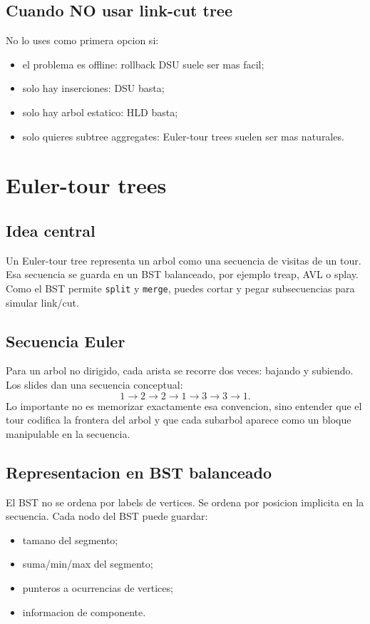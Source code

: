 \documentclass[10pt]{article}
\begin{document}
\subsection{Cuando NO usar link-cut tree}
No lo uses como primera opcion si:
\begin{itemize}[leftmargin=*]
\item el problema es offline: rollback DSU suele ser mas facil;
\item solo hay inserciones: DSU basta;
\item solo hay arbol estatico: HLD basta;
\item solo quieres subtree aggregates: Euler-tour trees suelen ser mas naturales.
\end{itemize}

\newpage
\section{Euler-tour trees}

\subsection{Idea central}
Un Euler-tour tree representa un arbol como una secuencia de visitas de un tour.
Esa secuencia se guarda en un BST balanceado, por ejemplo treap, AVL o splay.
Como el BST permite \texttt{split} y \texttt{merge}, puedes cortar y pegar
subsecuencias para simular link/cut.

\subsection{Secuencia Euler}
Para un arbol no dirigido, cada arista se recorre dos veces: bajando y subiendo.
Los slides dan una secuencia conceptual:
\[
1\to 2\to 2\to 1\to 3\to 3\to 1.
\]
Lo importante no es memorizar exactamente esa convencion, sino entender que el
tour codifica la frontera del arbol y que cada subarbol aparece como un bloque
manipulable en la secuencia.

\subsection{Representacion en BST balanceado}
El BST no se ordena por labels de vertices. Se ordena por posicion implicita en
la secuencia. Cada nodo del BST puede guardar:
\begin{itemize}[leftmargin=*]
\item tamano del segmento;
\item suma/min/max del segmento;
\item punteros a ocurrencias de vertices;
\item informacion de componente.
\end{itemize}
\end{document}
